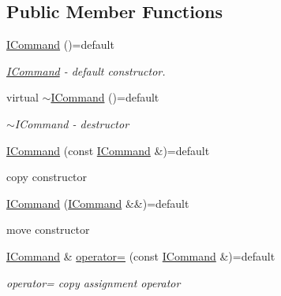 \subsection*{Public Member Functions}
\begin{DoxyCompactItemize}
\item 
\hyperlink{a00008_a2014cfaa28b505c08be8e84b2e1f0b3b_a2014cfaa28b505c08be8e84b2e1f0b3b}{I\+Command} ()=default
\begin{DoxyCompactList}\small\item\em \hyperlink{a00008}{I\+Command} -\/ default constructor. \end{DoxyCompactList}\item 
virtual \hyperlink{a00008_aae5aae528abd454f6635eace2e8ad52c_aae5aae528abd454f6635eace2e8ad52c}{$\sim$\+I\+Command} ()=default
\begin{DoxyCompactList}\small\item\em $\sim$\+I\+Command -\/ destructor \end{DoxyCompactList}\item 
\hyperlink{a00008_a96aa0372a4e822c147b790fe3edd0873_a96aa0372a4e822c147b790fe3edd0873}{I\+Command} (const \hyperlink{a00008}{I\+Command} \&)=default
\begin{DoxyCompactList}\small\item\em 
\begin{DoxyItemize}
\item copy constructor 
\end{DoxyItemize}\end{DoxyCompactList}\item 
\hyperlink{a00008_a038646163a965cbb7381d5d187ea72ee_a038646163a965cbb7381d5d187ea72ee}{I\+Command} (\hyperlink{a00008}{I\+Command} \&\&)=default
\begin{DoxyCompactList}\small\item\em 
\begin{DoxyItemize}
\item move constructor 
\end{DoxyItemize}\end{DoxyCompactList}\item 
\hyperlink{a00008}{I\+Command} \& \hyperlink{a00008_ac3fddc72743ad81ba928732aa768949f_ac3fddc72743ad81ba928732aa768949f}{operator=} (const \hyperlink{a00008}{I\+Command} \&)=default
\begin{DoxyCompactList}\small\item\em operator= copy assignment operator \end{DoxyCompactList}\item 

\end{DoxyCompactItemize}
